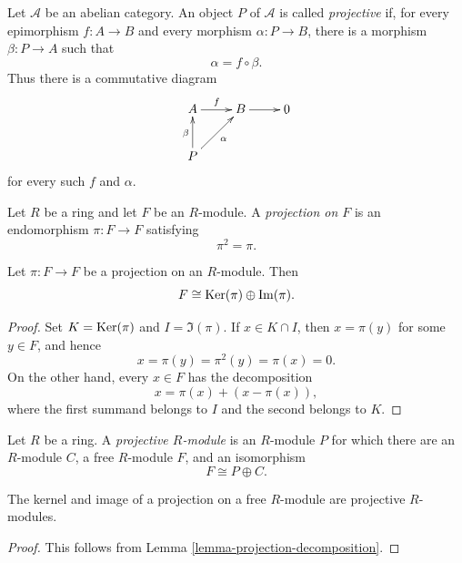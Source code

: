 \begin{definition}
\label{definition-projective}
Let $\mathcal{A}$ be an abelian category.
An object $P$ of $\mathcal{A}$ is called
{\it projective} if, for every epimorphism
$f:A\to B$ and every morphism
$\alpha:P\to B$, there is a morphism
$\beta:P\to A$ such that
$$
\alpha=f\circ\beta.
$$
Thus there is a commutative diagram
$$
\xymatrix{
A \ar[r]^f & B \ar[r] & 0 \\
P \ar[u]^{\beta} \ar[ur]_{\alpha} &
}
$$
for every such $f$ and $\alpha$.
\end{definition}

\begin{definition}
\label{definition-projection-module}
Let $R$ be a ring and let $F$ be an
$R$-module. A {\it projection on $F$} is
an endomorphism $\pi:F\to F$ satisfying
$$
\pi^2=\pi.
$$
\end{definition}

\begin{lemma}
\label{lemma-projection-decomposition}
Let $\pi:F\to F$ be a projection on an
$R$-module. Then
$$
F\cong\mathop{\mathrm{Ker}}(\pi)\oplus\mathop{\mathrm{Im}}(\pi).
$$
\end{lemma}

\begin{proof}
Set $K=\mathop{\mathrm{Ker}}(\pi)$ and $I=\Im(\pi)$.
If $x\in K\cap I$, then $x=\pi(y)$ for
some $y\in F$, and hence
$$
x=\pi(y)=\pi^2(y)=\pi(x)=0.
$$
On the other hand, every $x\in F$ has the
decomposition
$$
x=\pi(x)+(x-\pi(x)),
$$
where the first summand belongs to $I$ and
the second belongs to $K$.
\end{proof}

\begin{definition}
\label{definition-projective-direct-summand}
Let $R$ be a ring. A {\it projective
$R$-module} is an $R$-module $P$ for which
there are an $R$-module $C$, a free
$R$-module $F$, and an isomorphism
$$
F\cong P\oplus C.
$$
\end{definition}

\begin{corollary}
\label{lemma-projection-projective}
The kernel and image of a projection on a
free $R$-module are projective
$R$-modules.
\end{corollary}

\begin{proof}
This follows from Lemma
\ref{lemma-projection-decomposition}.
\end{proof}

